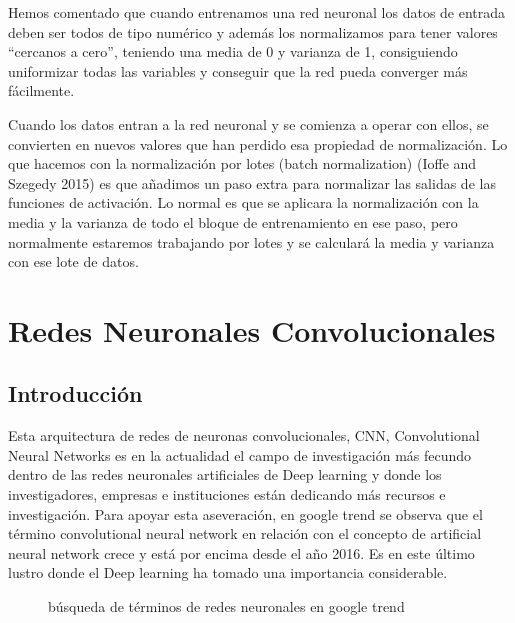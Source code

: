 \documentclass[
  a4paper,
  DIV=11,
  numbers=noendperiod]{scrreprt}
\begin{document}
Hemos comentado que cuando entrenamos una red neuronal los datos de
entrada deben ser todos de tipo numérico y además los normalizamos para
tener valores ``cercanos a cero'', teniendo una media de 0 y varianza de
1, consiguiendo uniformizar todas las variables y conseguir que la red
pueda converger más fácilmente.

Cuando los datos entran a la red neuronal y se comienza a operar con
ellos, se convierten en nuevos valores que han perdido esa propiedad de
normalización. Lo que hacemos con la normalización por lotes (batch
normalization) (Ioffe and Szegedy 2015) es que añadimos un paso extra
para normalizar las salidas de las funciones de activación. Lo normal es
que se aplicara la normalización con la media y la varianza de todo el
bloque de entrenamiento en ese paso, pero normalmente estaremos
trabajando por lotes y se calculará la media y varianza con ese lote de
datos.

\section{Redes Neuronales
Convolucionales}\label{redes-neuronales-convolucionales}

\subsection{Introducción}\label{introducciuxf3n-2}

Esta arquitectura de redes de neuronas convolucionales, CNN,
Convolutional Neural Networks es en la actualidad el campo de
investigación más fecundo dentro de las redes neuronales artificiales de
Deep learning y donde los investigadores, empresas e instituciones están
dedicando más recursos e investigación. Para apoyar esta aseveración, en
google trend se observa que el término convolutional neural network en
relación con el concepto de artificial neural network crece y está por
encima desde el año 2016. Es en este último lustro donde el Deep
learning ha tomado una importancia considerable.

\begin{figure}


\caption{\label{fig-busqueda-google}búsqueda de términos de redes
neuronales en google trend}

\end{figure}%
\end{document}
